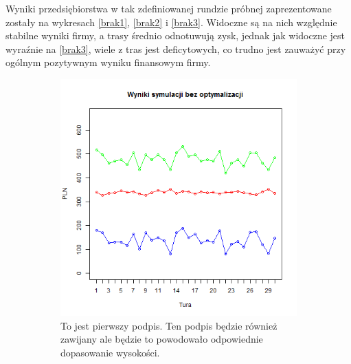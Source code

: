 \documentclass[polish, twoside, 12pt, a4paper]{article}
\theoremstyle{definition}
\theoremstyle{plain}
\theoremstyle{remark}
\begin{document}
Wyniki przedsiębiorstwa w tak zdefiniowanej rundzie próbnej zaprezentowane zostały na wykresach \ref{brak1}, \ref{brak2} i \ref{brak3}. Widoczne są na nich względnie stabilne wyniki firmy, a trasy średnio odnotuwują zysk, jednak jak widoczne jest wyraźnie na \ref{brak3}, wiele z tras jest deficytowych, co trudno jest zauważyć przy ogólnym pozytywnym wyniku finansowym firmy.  

\begin{figure}[hbt]
  \centering
  \begin{subfigure}[t]{0.45\textwidth}
    \includegraphics[width=\textwidth]{pictures/brak_algorytmu/wyniki.png}
    \caption{To jest pierwszy podpis. Ten podpis będzie również zawijany ale będzie to powodowało odpowiednie dopasowanie wysokości.}
    \label{fig:brak1}
  \end{subfigure}
  \hfill
  \begin{subfigure}[t]{0.45\textwidth}

\end{subfigure}
\end{figure}
\end{document}
